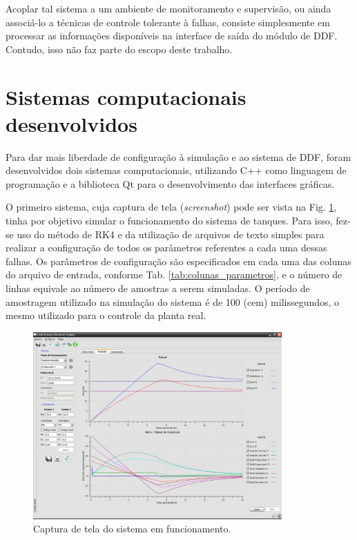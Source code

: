 Acoplar tal sistema a um ambiente de monitoramento e supervisão, ou ainda
associá-lo a técnicas de controle tolerante à falhas, consiste simplesmente em
processar as informações disponíveis na interface de saída do módulo de DDF.
Contudo, isso não faz parte do escopo deste trabalho.

\section{Sistemas computacionais desenvolvidos}
Para dar mais liberdade de configuração à simulação e ao sistema de DDF, foram
desenvolvidos dois sistemas computacionais, utilizando C++ como linguagem de
programação e a biblioteca Qt para o desenvolvimento das interfaces gráficas.

O primeiro sistema, cuja captura de tela ({\it screenshot}) pode ser vista na
Fig. \ref{fig:captura}, tinha por objetivo simular o funcionamento do sistema de
tanques. Para isso, fez-se uso do método de RK4 e da utilização de arquivos de
texto simples para realizar a configuração de todos os parâmetros referentes a
cada uma dessas falhas. Os parâmetros de configuração são especificados em cada
uma das colunas do arquivo de entrada, conforme Tab.
\ref{tab:colunas_parametros}, e o número de linhas equivale ao número de
amostras a serem simuladas. O período de amostragem utilizado na simulação do
sistema é de 100 (cem) milissegundos, o mesmo utilizado para o controle da
planta real.

\begin{figure}[htb]
\centering
    \includegraphics[width=0.85\textwidth]{imgs/sistema/eps/captura}
    \caption{Captura de tela do sistema em funcionamento.}
    \label{fig:captura}
\end{figure}


